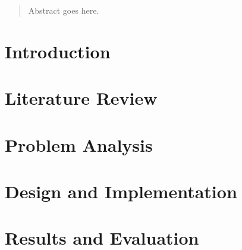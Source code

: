\documentclass[11pt]{report}
\begin{document}





\begin{abstract}
Abstract goes here.
\end{abstract}



\tableofcontents



\chapter{Introduction}



\chapter{Literature Review}




\chapter{Problem Analysis}



\chapter{Design and Implementation}



\chapter{Results and Evaluation}

\end{document}
